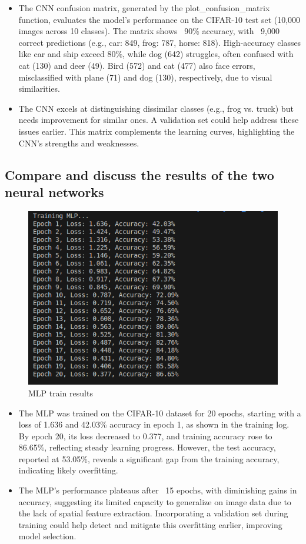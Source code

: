 \documentclass[a4paper,12pt]{article}
\begin{document}
\begin{itemize}
    \item The CNN confusion matrix, generated by the plot\_confusion\_matrix function, evaluates the model’s performance on the CIFAR-10 test set (10,000 images across 10 classes). The matrix shows ~90\% accuracy, with ~9,000 correct predictions (e.g., car: 849, frog: 787, horse: 818). High-accuracy classes like car and ship exceed 80\%, while dog (642) struggles, often confused with cat (130) and deer (49). Bird (572) and cat (477) also face errors, misclassified with plane (71) and dog (130), respectively, due to visual similarities. 
    
    \item The CNN excels at distinguishing dissimilar classes (e.g., frog vs. truck) but needs improvement for similar ones. A validation set could help address these issues earlier. This matrix complements the learning curves, highlighting the CNN’s strengths and weaknesses.
\end{itemize}
\newpage

\subsection{Compare and discuss the results of the two neural networks}

\begin{figure}[h]
    \centering
    \includegraphics[width=0.6\linewidth]{images/MLP_train.png}
    \caption{MLP train results}
    \label{fig:enter-label}
\end{figure}

\begin{itemize}
    \item The MLP was trained on the CIFAR-10 dataset for 20 epochs, starting with a loss of 1.636 and 42.03\% accuracy in epoch 1, as shown in the training log. By epoch 20, its loss decreased to 0.377, and training accuracy rose to 86.65\%, reflecting steady learning progress. However, the test accuracy, reported at 53.05\%, reveals a significant gap from the training accuracy, indicating likely overfitting. 
    
    \item The MLP’s performance plateaus after ~15 epochs, with diminishing gains in accuracy, suggesting its limited capacity to generalize on image data due to the lack of spatial feature extraction. Incorporating a validation set during training could help detect and mitigate this overfitting earlier, improving model selection.
\end{itemize}
\end{document}
